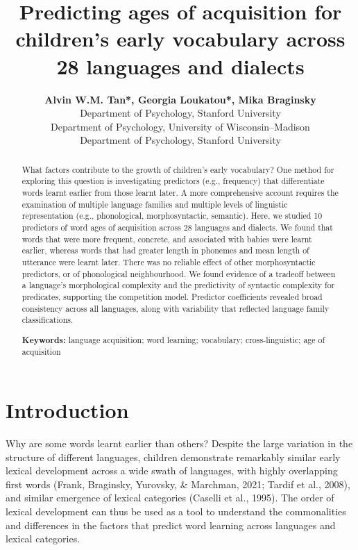 \documentclass[10pt, letterpaper]{article}
\title{Predicting ages of acquisition for children's early vocabulary
across 28 languages and dialects}
\author{{\large \bf Alvin W.M. Tan*, Georgia Loukatou*, Mika Braginsky} \\ Department of Psychology, Stanford University \AND {\large \bf Jess Mankewitz} \\ Department of Psychology, University of Wisconsin--Madison \AND {\large \bf Michael C. Frank} \\ Department of Psychology, Stanford University}
\begin{document}
\maketitle

\begin{abstract}
What factors contribute to the growth of children's early vocabulary?
One method for exploring this question is investigating predictors
(e.g., frequency) that differentiate words learnt earlier from those
learnt later. A more comprehensive account requires the examination of
multiple language families and multiple levels of linguistic
representation (e.g., phonological, morphosyntactic, semantic). Here, we
studied 10 predictors of word ages of acquisition across 28 languages
and dialects. We found that words that were more frequent, concrete, and
associated with babies were learnt earlier, whereas words that had
greater length in phonemes and mean length of utterance were learnt
later. There was no reliable effect of other morphosyntactic predictors,
or of phonological neighbourhood. We found evidence of a tradeoff
between a language's morphological complexity and the predictivity of
syntactic complexity for predicates, supporting the competition model.
Predictor coefficients revealed broad consistency across all languages,
along with variability that reflected language family classifications.

\textbf{Keywords:}
language acquisition; word learning; vocabulary; cross-linguistic; age
of acquisition
\end{abstract}

\hypertarget{introduction}{%
\section{Introduction}\label{introduction}}

Why are some words learnt earlier than others? Despite the large
variation in the structure of different languages, children demonstrate
remarkably similar early lexical development across a wide swath of
languages, with highly overlapping first words (Frank, Braginsky,
Yurovsky, \& Marchman, 2021; Tardif et al., 2008), and similar emergence
of lexical categories (Caselli et al., 1995). The order of lexical
development can thus be used as a tool to understand the commonalities
and differences in the factors that predict word learning across
languages and lexical categories.
\end{document}
